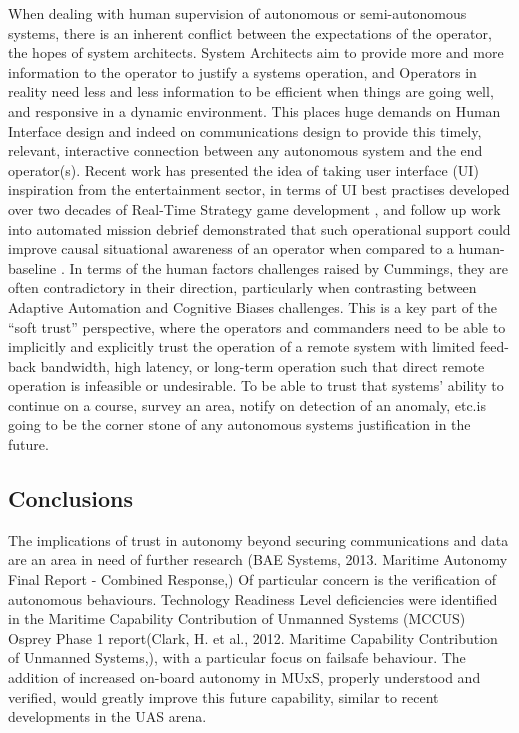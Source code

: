 When dealing with human supervision of autonomous or semi-autonomous systems, there is an inherent conflict between the expectations of the operator, the hopes of system architects.
System Architects aim to provide more and more information to the operator to justify a systems operation, and Operators in reality need less and less information to be efficient when things are going well, and responsive in a dynamic environment.
This places huge demands on Human Interface design and indeed on communications design to provide this timely, relevant, interactive connection between any autonomous system and the end operator(s).
Recent work has presented the idea of taking user interface (UI) inspiration from the entertainment sector, in terms of UI best practises developed over two decades of Real-Time Strategy game development \cite{Johnson2007}, and follow up work into automated mission debrief demonstrated that such operational support could improve causal situational awareness of an operator when compared to a human-baseline \cite{Johnson2011}.
In terms of the human factors challenges raised by Cummings, they are often contradictory in their direction, particularly when contrasting between Adaptive Automation and Cognitive Biases challenges.
This is a key part of the ``soft trust'' perspective, where the operators and commanders need to be able to implicitly and explicitly trust the operation of a remote system with limited feed-back bandwidth, high latency, or long-term operation such that direct remote operation is infeasible or undesirable.
To be able to trust that systems’ ability to continue on a course, survey an area, notify on detection of an anomaly, etc.is going to be the corner stone of any autonomous systems justification in the future.

\subsection{Conclusions}


The implications of trust in autonomy beyond securing communications and data are an area in need of further research (BAE Systems, 2013. Maritime Autonomy Final Report - Combined Response,)
Of particular concern is the verification of autonomous behaviours.
Technology Readiness Level deficiencies were identified in the Maritime Capability Contribution of Unmanned Systems (MCCUS) Osprey Phase 1 report(Clark, H. et al., 2012. Maritime Capability Contribution of Unmanned Systems,), with a particular focus on failsafe behaviour.
The addition of increased on-board autonomy in MUxS, properly understood and verified, would greatly improve this future capability, similar to recent developments in the UAS arena\cite{Cummings2010}.

